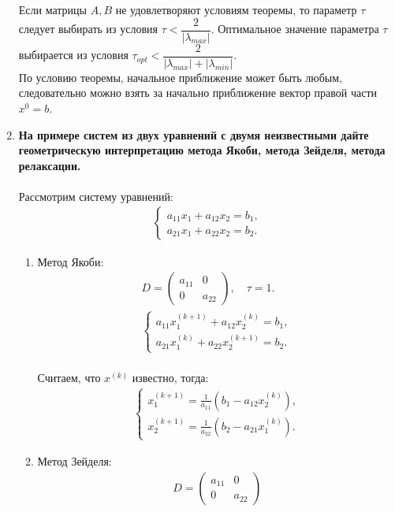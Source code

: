 \documentclass[12pt,a4paper]{article}
\begin{document}
\begin{enumerate}
\par
Если матрицы $A, B$ не удовлетворяют условиям теоремы, то параметр $\tau$ следует выбирать из условия $\tau<\dfrac{2}{|\lambda_{max}|}$. Оптимальное значение параметра $\tau$ выбирается из условия $\tau_{opt}<\dfrac{2}{|\lambda_{max}|+|\lambda_{min}|}$.\\
По условию теоремы, начальное приближение может быть любым, следовательно можно взять за начально приближение вектор правой части $x^0=b$. 
\\
\item \textbf{На примере систем из двух уравнений с двумя неизвестными дайте геометрическую интерпретацию метода Якоби, метода Зейделя, метода релаксации.}\\
\\
Рассмотрим систему уравнений:
\begin{gather*}
\begin{cases}
a_{11} x_1+a_{12} x_2=b_1,\\
a_{21} x_1+a_{22} x_2=b_2.
\end{cases}
\end{gather*}
\begin{enumerate}
\item Метод Якоби:\\
\begin{gather*}
D=
\begin{pmatrix}
a_{11} & 0\\
0 & a_{22}
\end{pmatrix}, \quad \tau=1.\\
\begin{cases}
a_{11} x_1^{(k+1)}+a_{12} x_2^{(k)}=b_1,\\
a_{21} x_1^{(k)}+a_{22} x_2^{(k+1)}=b_2.
\end{cases}
\end{gather*}
\\
Считаем, что $x^{(k)}$ известно, тогда:
\begin{gather*}
\begin{cases}
x_1^{(k+1)}=\frac{1}{a_{11}} (b_1-a_{12} x_2^{(k)}),\\
x_2^{(k+1)}=\frac{1}{a_{22}} (b_2-a_{21} x_1^{(k)}).
\end{cases}
\end{gather*}
\item Метод Зейделя:\\
\begin{gather*}
D=
\begin{pmatrix}
a_{11} & 0\\
0 & a_{22}

\end{pmatrix}
\end{gather*}
\end{enumerate}
\end{enumerate}
\end{document}
